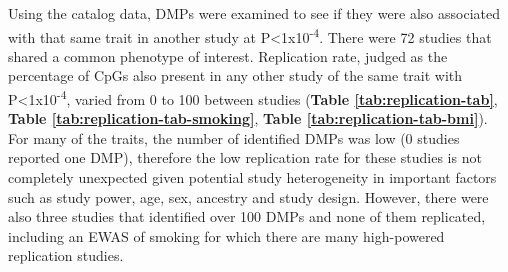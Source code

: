 \documentclass[11pt,twoside]{bristolthesis}
\begin{document}
Using the catalog data, DMPs were examined to see if they were also associated with that same trait in another study at P\textless1x10\textsuperscript{-4}. There were 72 studies that shared a common phenotype of interest. Replication rate, judged as the percentage of CpGs also present in any other study of the same trait with P\textless1x10\textsuperscript{-4}, varied from 0 to 100 between studies (\textbf{Table \ref{tab:replication-tab}}, \textbf{Table \ref{tab:replication-tab-smoking}}, \textbf{Table \ref{tab:replication-tab-bmi}}). For many of the traits, the number of identified DMPs was low (0 studies reported one DMP), therefore the low replication rate for these studies is not completely unexpected given potential study heterogeneity in important factors such as study power, age, sex, ancestry and study design. However, there were also three studies that identified over 100 DMPs and none of them replicated, including an EWAS of smoking for which there are many high-powered replication studies. \linebreak
\end{document}
